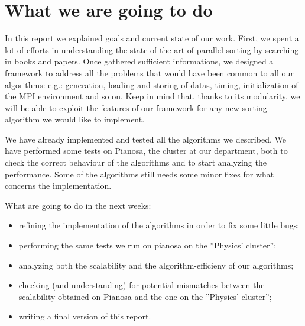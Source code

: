 \section{What we are going to do}
In this report we explained goals and current state of our work. First, we spent a lot of efforts in understanding the state of the art of parallel sorting by searching in books and papers. Once gathered sufficient informations, we designed a framework to address all the problems that would have been common to all our algorithms: e.g.: generation, loading and storing of datas, timing, initialization of the MPI environment and so on. Keep in mind that, thanks to its modularity, we will be able to exploit the features of our framework for any new sorting algorithm we would like to implement. 

We have already implemented and tested all the algorithms we described. We have performed some tests on Pianosa, the cluster at our department, both to check the correct behaviour of the algorithms and to start analyzing the performance. Some of the algorithms still needs some minor fixes for what concerns the implementation.

What are going to do in the next weeks:
\begin{itemize}
\item refining the implementation of the algorithms in order to fix some little bugs;
\item performing the same tests we run on pianosa on the ''Physics' cluster'';
\item analyzing both the scalability and the algorithm-efficieny of our algorithms;
\item checking (and understanding) for potential mismatches between the scalability obtained on Pianosa and the one on the ''Physics' cluster'';
\item writing a final version of this report.
\end{itemize}